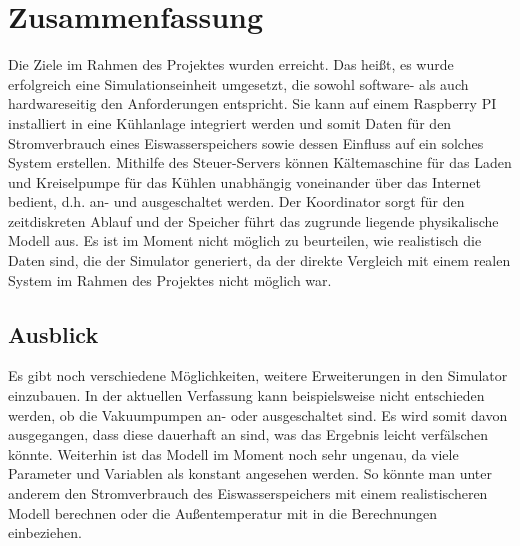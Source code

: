 \chapter{Zusammenfassung}
Die Ziele im Rahmen des Projektes wurden erreicht. Das heißt, es wurde erfolgreich eine Simulationseinheit umgesetzt, die sowohl software- als auch hardwareseitig den Anforderungen entspricht. Sie kann auf einem Raspberry PI installiert in eine Kühlanlage integriert werden und somit Daten für den Stromverbrauch eines Eiswasserspeichers sowie dessen Einfluss auf ein solches System erstellen.
Mithilfe des Steuer-Servers können Kältemaschine für das Laden und Kreiselpumpe für das Kühlen unabhängig voneinander über das Internet bedient, d.h. an- und ausgeschaltet werden. Der Koordinator sorgt für den zeitdiskreten Ablauf und der Speicher führt das zugrunde liegende physikalische Modell aus.
Es ist im Moment nicht möglich zu beurteilen, wie realistisch die Daten sind, die der Simulator generiert, da der direkte Vergleich mit einem realen System im Rahmen des Projektes nicht möglich war.

\section{Ausblick}
Es gibt noch verschiedene Möglichkeiten, weitere Erweiterungen in den Simulator einzubauen. In der aktuellen Verfassung kann beispielsweise nicht entschieden werden, ob die Vakuumpumpen an- oder ausgeschaltet sind. Es wird somit davon ausgegangen, dass diese dauerhaft an sind, was das Ergebnis leicht verfälschen könnte. Weiterhin ist das Modell im Moment noch sehr ungenau, da viele Parameter und Variablen als konstant angesehen werden. So könnte man unter anderem den Stromverbrauch des Eiswasserspeichers mit einem realistischeren Modell berechnen oder die Außentemperatur mit in die Berechnungen einbeziehen. %